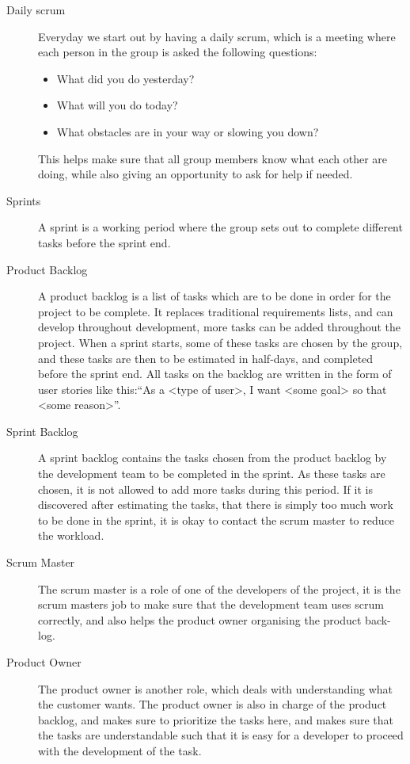 \begin{description}
	\item[Daily scrum] Everyday we start out by having a daily scrum, which is a meeting where each person in the group is asked the following questions:
		\begin{itemize}
		    \item What did you do yesterday? 
			\item What will you do today?
			\item What obstacles are in your way or slowing you down?		
		\end{itemize}
		This helps make sure that all group members know what each other are doing, while also giving an opportunity to ask for help if needed.

	\item[Sprints] A sprint is a working period where the group sets out to complete different tasks before the sprint end. 
	\item[Product Backlog] A product backlog is a list of tasks which are to be done in order for the project to be complete. 
	It replaces traditional requirements lists, and can develop throughout development, more tasks can be added throughout the project.
	When a sprint starts, some of these tasks are chosen by the group, and these tasks are then to be estimated in half-days, and completed before the sprint end.
	All tasks on the backlog are written in the form of user stories like this:``As a <type of user>, I want <some goal> so that <some reason>''.
	\item[Sprint Backlog] A sprint backlog contains the tasks chosen from the product backlog by the development team to be completed in the sprint.
	As these tasks are chosen, it is not allowed to add more tasks during this period.
	If it is discovered after estimating the tasks, that there is simply too much work to be done in the sprint, it is okay to contact the scrum master to reduce the workload.
	\item[Scrum Master] The scrum master is a role of one of the developers of the project, it is the scrum masters job to make sure that the development team uses scrum correctly, and also helps the product owner organising the product back-log.
	\item[Product Owner] The product owner is another role, which deals with understanding what the customer wants.
	The product owner is also in charge of the product backlog, and makes sure to prioritize the tasks here, and makes sure that the tasks are understandable such that it is easy for a developer to proceed with the development of the task.

\end{description}
